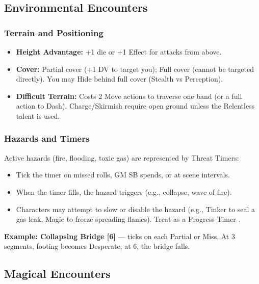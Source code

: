 \subsection{Environmental Encounters}

\subsubsection{Terrain and Positioning}
\begin{itemize}
  \item \textbf{Height Advantage:} +1 die or +1 Effect for attacks from above.
  \item \textbf{Cover:} Partial cover (+1 DV to target you); Full cover (cannot be targeted directly). You may Hide behind full cover (Stealth vs Perception).
  \item \textbf{Difficult Terrain:} Costs 2 Move actions to traverse one band (or a full action to Dash). Charge/Skirmish require open ground unless the Relentless talent is used.
\end{itemize}

\subsubsection{Hazards and Timers}
Active hazards (fire, flooding, toxic gas) are represented by Threat Timers:
\begin{itemize}
  \item Tick the timer on missed rolls, GM SB spends, or at scene intervals.
  \item When the timer fills, the hazard triggers (e.g., collapse, wave of fire).
  \item Characters may attempt to slow or disable the hazard (e.g., Tinker to seal a gas leak, Magic to freeze spreading flames). Treat as a Progress Timer .
\end{itemize}

\textbf{Example: Collapsing Bridge [6]} --- ticks on each Partial or Miss. At 3 segments, footing becomes Desperate; at 6, the bridge falls.

\subsection{Magical Encounters}

